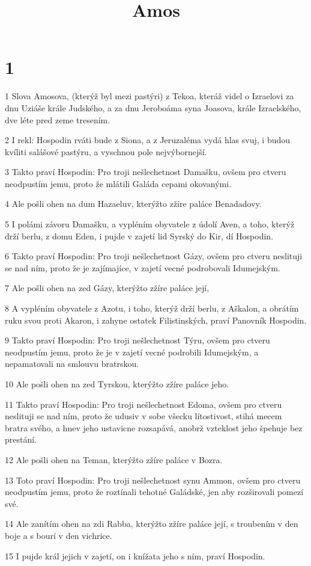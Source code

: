 

\title{Amos}

\chapter{1}

\par 1 Slova Amosova, (kterýž byl mezi pastýri) z Tekoa, kteráž videl o Izraelovi za dnu Uziáše krále Judského, a za dnu Jeroboáma syna Joasova, krále Izraelského, dve léte pred zeme tresením.
\par 2 I rekl: Hospodin rváti bude z Siona, a z Jeruzaléma vydá hlas svuj, i budou kvíliti salášové pastýru, a vyschnou pole nejvýbornejší.
\par 3 Takto praví Hospodin: Pro troji nešlechetnost Damašku, ovšem pro ctveru neodpustím jemu, proto že mlátili Galáda cepami okovanými.
\par 4 Ale pošli ohen na dum Hazaeluv, kterýžto zžíre paláce Benadadovy.
\par 5 I polámi závoru Damašku, a vypléním obyvatele z údolí Aven, a toho, kterýž drží berlu, z domu Eden, i pujde v zajetí lid Syrský do Kir, dí Hospodin.
\par 6 Takto praví Hospodin: Pro troji nešlechetnost Gázy, ovšem pro ctveru neslituji se nad ním, proto že je zajímajíce, v zajetí vecné podrobovali Idumejským.
\par 7 Ale pošli ohen na zed Gázy, kterýžto zžíre paláce její,
\par 8 A vypléním obyvatele z Azotu, i toho, kterýž drží berlu, z Aškalon, a obrátím ruku svou proti Akaron, i zahyne ostatek Filistinských, praví Panovník Hospodin.
\par 9 Takto praví Hospodin: Pro troji nešlechetnost Týru, ovšem pro ctveru neodpustím jemu, proto že je v zajetí vecné podrobili Idumejským, a nepamatovali na smlouvu bratrskou.
\par 10 Ale pošli ohen na zed Tyrskou, kterýžto zžíre paláce jeho.
\par 11 Takto praví Hospodin: Pro troji nešlechetnost Edoma, ovšem pro ctveru neslituji se nad ním, proto že udusiv v sobe všecku lítostivost, stihá mecem bratra svého, a hnev jeho ustavicne rozsapává, anobrž vzteklost jeho špehuje bez prestání.
\par 12 Ale pošli ohen na Teman, kterýžto zžíre paláce v Bozra.
\par 13 Toto praví Hospodin: Pro troji nešlechetnost synu Ammon, ovšem pro ctveru neodpustím jemu, proto že roztínali tehotné Galádské, jen aby rozširovali pomezí své.
\par 14 Ale zanítím ohen na zdi Rabba, kterýžto zžíre paláce její, s troubením v den boje a s bourí v den vichrice.
\par 15 I pujde král jejich v zajetí, on i knížata jeho s ním, praví Hospodin.

